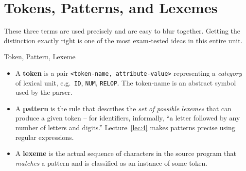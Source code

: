 \documentclass[full-course-notes.tex]{subfiles}
\begin{document}
\section{Tokens, Patterns, and Lexemes}
\label{sec:l3-tokens-patterns-lexemes}

\dbtag These three terms are used precisely and are easy to blur together. Getting the
distinction exactly right is one of the most exam-tested ideas in this entire unit.

\begin{defbox}{Token, Pattern, Lexeme}
\begin{itemize}
  \item A \textbf{token} is a pair \texttt{<token-name, attribute-value>} representing a
  \emph{category} of lexical unit, e.g.\ \texttt{ID}, \texttt{NUM}, \texttt{RELOP}. The
  token-name is an abstract symbol used by the parser.
  \item A \textbf{pattern} is the rule that describes the \emph{set of possible lexemes} that
  can produce a given token -- for identifiers, informally, ``a letter followed by any number of
  letters and digits.'' Lecture~\ref{lec:4} makes patterns precise using regular expressions.
  \item A \textbf{lexeme} is the actual sequence of characters in the source program that
  \emph{matches} a pattern and is classified as an instance of some token.
\end{itemize}
\end{defbox}

\begin{center}
\end{center}
\end{document}
